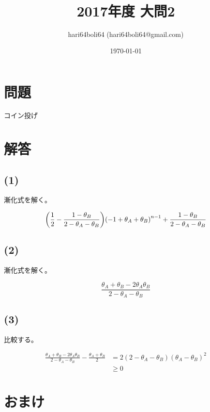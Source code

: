 \documentclass[a4paper, 10pt, dvipdfmx]{jlreq}
\begin{document}
\title{2017年度 大問2}
\author{hari64boli64 (hari64boli64@gmail.com)}
\date{\today}
\maketitle

\section{問題}

コイン投げ

\section{解答}

\subsection*{(1)}

漸化式を解く。

\begin{equation*}
  \qty(\frac{1}{2} - \frac{1-\theta_B}{2-\theta_A-\theta_B}) \qty(-1+\theta_A+\theta_B)^{n-1}+\frac{1-\theta_B}{2-\theta_A-\theta_B}
\end{equation*}

\subsection*{(2)}

漸化式を解く。

\begin{equation*}
  \frac{\theta_A+\theta_B-2\theta_A\theta_B}{2-\theta_A-\theta_B}
\end{equation*}

\subsection*{(3)}

比較する。

\begin{align*}
  \frac{\theta_A+\theta_B-2\theta_A\theta_B}{2-\theta_A-\theta_B} - \frac{\theta_A+\theta_B}{2} & = 2(2-\theta_A-\theta_B)(\theta_A-\theta_B)^2 \\
                                                                                                & \geq 0
\end{align*}


\section{おまけ}
\end{document}
